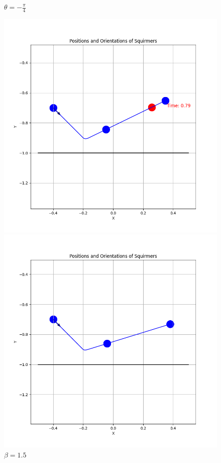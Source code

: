 \documentclass{article}
\begin{document}
\begin{figure}[H]
    \centering
    \textbf{$\theta = -\frac{\pi}{4}$}\par\medskip
    \begin{minipage}{0.49\textwidth}
        \includegraphics[width=1.1\textwidth]{graphs/simulations/border/beta1_5/mpi_4.png}
        \caption{\footnotesize $\beta = 1.5$}
    \end{minipage}\hfill
    \begin{minipage}{0.49\textwidth}
        \includegraphics[width=1.1\textwidth]{graphs/simulations/border/beta3/mpi_4.png}

\end{minipage}
\end{figure}
\end{document}
